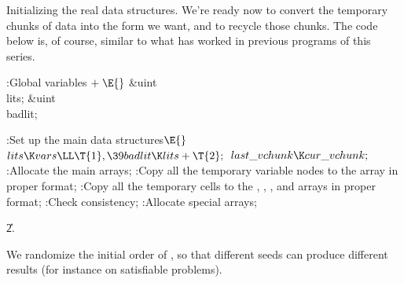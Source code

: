 Initializing the real data structures.
We're ready now to convert the temporary chunks of data into the
form we want, and to recycle those chunks. The code below is, of course,
similar to what has worked in previous programs of this series.

\Y\B\4:Global variables\X${}\mathrel+\E{}$\6
\&{uint} \\{lits};\6
\&{uint} \\{badlit};\par
\fi

\B{}:Set up the main data structures\X${}\E{}$\6
$\\{lits}\K\\{vars}\LL\T{1},\39\\{badlit}\K\\{lits}+\T{2};{}$\6
${}\\{last\_vchunk}\K\\{cur\_vchunk};{}$\6
:Allocate the main arrays\X;\6
:Copy all the temporary variable nodes to the  array in proper
format\X;\6
:Copy all the temporary cells to the , , , and  arrays in proper format\X;\6
:Check consistency\X;\6
:Allocate special arrays\X;\par
\U2.\fi

We randomize the initial order of , so that different
seeds
can produce different results (for instance on satisfiable problems).

